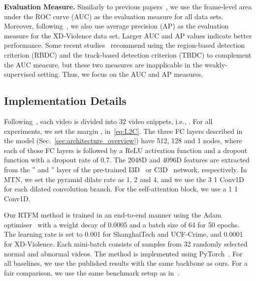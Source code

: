 \documentclass[10pt,twocolumn,letterpaper]{article}
\begin{document}
\textbf{Evaluation Measure.} Similarly  to previous papers~\cite{sultani2018real,liu2018future,8803657,9102722,gong2019memorizing}, we use the frame-level area under the ROC curve (AUC) as the evaluation measure for all data sets. 
Moreover, following~\cite{Wu2020not}, we also use average precision (AP) as the evaluation measure for the XD-Violence data set. Larger AUC and AP values indicate better performance. Some recent studies~\cite{georgescu2020anomaly,ramachandra2020survey} recommend using the region-based detection criterion (RBDC) and the track-based detection criterion (TBDC) to complement the AUC measure, but these two measures are inapplicable in the weakly-supervised setting. Thus, we focus on the AUC and AP measures.




\subsection{Implementation Details} \label{subsec:imp}
Following~\cite{sultani2018real}, each video is divided into 32 video snippets, i.e., .
For all experiments, we set the margin ,  in~\eqref{eq:L2C}.
The three FC layers described in the model (Sec.~\ref{sec:architecture_overview}) have 512, 128 and 1 nodes, where each of those FC layers is followed by a ReLU activation function and a dropout function with a dropout rate of 0.7. The 2048D and 4096D features are extracted from the '' and '' layer of the pre-trained I3D~\cite{kay2017kinetics} or C3D~\cite{KarpathyCVPR14} network, respectively. In MTN, we set the pyramid dilate rate as 1, 2 and 4, and we use the 3  1 Conv1D for each dilated convolution branch. For the self-attention block, we use a 1  1 Conv1D. 



Our RTFM method is trained in an end-to-end manner using the Adam optimiser~\cite{kingma2014adam} with a weight decay of 0.0005 and a batch size of 64 for 50 epochs. 
The learning rate is set to 0.001 for ShanghaiTech and UCF-Crime, and 0.0001 for XD-Violence. Each mini-batch consists of samples from 32 randomly selected normal and abnormal videos. The method is implemented using PyTorch~\cite{NEURIPS2019_9015}. 
For all baselines, we use the published results with the same backbone as ours. For a fair comparison, we use the same benchmark setup as in~\cite{sultani2018real,Wu2020not,zhong2019graph}.
\end{document}
